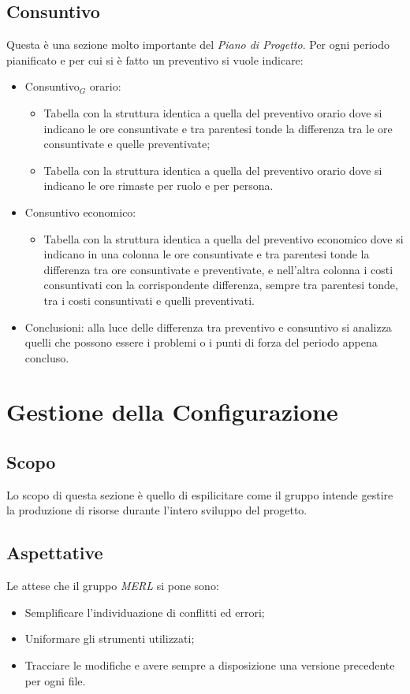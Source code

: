 \subsection{Consuntivo}
Questa è una sezione molto importante del \textit{Piano di Progetto}.
Per ogni periodo pianificato e per cui si è fatto un preventivo si vuole indicare:
\begin{itemize}
    \item Consuntivo$_G$ orario:
        \begin{itemize}
            \item Tabella con la struttura identica a quella del preventivo orario dove si indicano le ore consuntivate e tra parentesi tonde la differenza tra le ore consuntivate e quelle preventivate;
            \item Tabella con la struttura identica a quella del preventivo orario dove si indicano le ore rimaste per ruolo e per persona.
        \end{itemize}
    \item Consuntivo economico:
        \begin{itemize}
            \item Tabella con la struttura identica a quella del preventivo economico dove si indicano in una colonna le ore consuntivate e tra parentesi tonde la differenza tra ore consuntivate e preventivate, e nell'altra colonna i costi consuntivati con la corrispondente differenza, sempre tra parentesi tonde, tra i costi consuntivati e quelli preventivati.
        \end{itemize}
    \item Conclusioni: alla luce delle differenza tra preventivo e consuntivo si analizza quelli che possono essere i problemi o i punti di forza del periodo appena concluso.
\end{itemize}


\section{Gestione della Configurazione}
\subsection{Scopo}
    Lo scopo di questa sezione è quello di espilicitare come il gruppo intende gestire la produzione di
    risorse durante l'intero sviluppo del progetto.
 \subsection{Aspettative}
    Le attese che il gruppo \textit{MERL} si pone sono:
    \begin{itemize}
        \item Semplificare l'individuazione di conflitti ed errori;
        \item Uniformare gli strumenti utilizzati;
        \item Tracciare le modifiche e avere sempre a disposizione una versione precedente per ogni file.
    \end{itemize}
